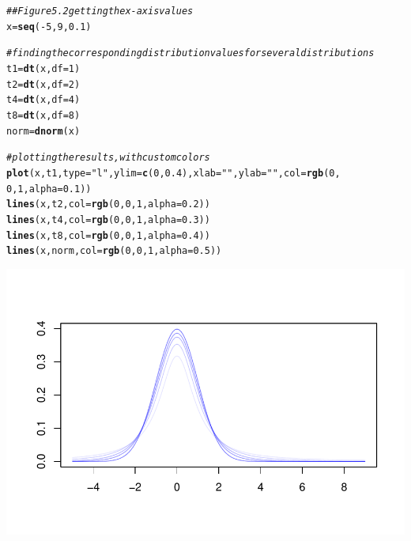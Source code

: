\documentclass{report}\usepackage[]{graphicx}\usepackage[]{color}
\makeatletter
\def\maxwidth{ %
  \ifdim\Gin@nat@width>\linewidth
    \linewidth
  \else
    \Gin@nat@width
  \fi
}
\newcommand{\hlnum}[1]{\textcolor[rgb]{0.686,0.059,0.569}{#1}}%
\newcommand{\hlstr}[1]{\textcolor[rgb]{0.192,0.494,0.8}{#1}}%
\newcommand{\hlcom}[1]{\textcolor[rgb]{0.678,0.584,0.686}{\textit{#1}}}%
\newcommand{\hlopt}[1]{\textcolor[rgb]{0,0,0}{#1}}%
\newcommand{\hlstd}[1]{\textcolor[rgb]{0.345,0.345,0.345}{#1}}%
\newcommand{\hlkwb}[1]{\textcolor[rgb]{0.69,0.353,0.396}{#1}}%
\newcommand{\hlkwc}[1]{\textcolor[rgb]{0.333,0.667,0.333}{#1}}%
\newcommand{\hlkwd}[1]{\textcolor[rgb]{0.737,0.353,0.396}{\textbf{#1}}}%
\newenvironment{kframe}{%
 \def\at@end@of@kframe{}%
 \ifinner\ifhmode%
  \def\at@end@of@kframe{\end{minipage}}%
  \begin{minipage}{\columnwidth}%
 \fi\fi%
 \def\FrameCommand##1{\hskip\@totalleftmargin \hskip-\fboxsep
 \colorbox{shadecolor}{##1}\hskip-\fboxsep
     \hskip-\linewidth \hskip-\@totalleftmargin \hskip\columnwidth}%
 \MakeFramed {\advance\hsize-\width
   \@totalleftmargin\z@ \linewidth\hsize
   \@setminipage}}%
 {\par\unskip\endMakeFramed%
 \at@end@of@kframe}
\newenvironment{knitrout}{}{} %
\makeatother
\begin{document}
\begin{knitrout}
\color{fgcolor}\begin{kframe}
\begin{alltt}
\hlcom{## Figure 5.2 getting the x-axis values}
\hlstd{x} \hlkwb{=} \hlkwd{seq}\hlstd{(}\hlopt{-}\hlnum{5}\hlstd{,} \hlnum{9}\hlstd{,} \hlnum{0.1}\hlstd{)}

\hlcom{# finding the corresponding distribution values for several distributions}
\hlstd{t1} \hlkwb{=} \hlkwd{dt}\hlstd{(x,} \hlkwc{df} \hlstd{=} \hlnum{1}\hlstd{)}
\hlstd{t2} \hlkwb{=} \hlkwd{dt}\hlstd{(x,} \hlkwc{df} \hlstd{=} \hlnum{2}\hlstd{)}
\hlstd{t4} \hlkwb{=} \hlkwd{dt}\hlstd{(x,} \hlkwc{df} \hlstd{=} \hlnum{4}\hlstd{)}
\hlstd{t8} \hlkwb{=} \hlkwd{dt}\hlstd{(x,} \hlkwc{df} \hlstd{=} \hlnum{8}\hlstd{)}
\hlstd{norm} \hlkwb{=} \hlkwd{dnorm}\hlstd{(x)}

\hlcom{# plotting the results, with custom colors}
\hlkwd{plot}\hlstd{(x, t1,} \hlkwc{type} \hlstd{=} \hlstr{"l"}\hlstd{,} \hlkwc{ylim} \hlstd{=} \hlkwd{c}\hlstd{(}\hlnum{0}\hlstd{,} \hlnum{0.4}\hlstd{),} \hlkwc{xlab} \hlstd{=} \hlstr{""}\hlstd{,} \hlkwc{ylab} \hlstd{=} \hlstr{""}\hlstd{,} \hlkwc{col} \hlstd{=} \hlkwd{rgb}\hlstd{(}\hlnum{0}\hlstd{,}
    \hlnum{0}\hlstd{,} \hlnum{1}\hlstd{,} \hlkwc{alpha} \hlstd{=} \hlnum{0.1}\hlstd{))}
\hlkwd{lines}\hlstd{(x, t2,} \hlkwc{col} \hlstd{=} \hlkwd{rgb}\hlstd{(}\hlnum{0}\hlstd{,} \hlnum{0}\hlstd{,} \hlnum{1}\hlstd{,} \hlkwc{alpha} \hlstd{=} \hlnum{0.2}\hlstd{))}
\hlkwd{lines}\hlstd{(x, t4,} \hlkwc{col} \hlstd{=} \hlkwd{rgb}\hlstd{(}\hlnum{0}\hlstd{,} \hlnum{0}\hlstd{,} \hlnum{1}\hlstd{,} \hlkwc{alpha} \hlstd{=} \hlnum{0.3}\hlstd{))}
\hlkwd{lines}\hlstd{(x, t8,} \hlkwc{col} \hlstd{=} \hlkwd{rgb}\hlstd{(}\hlnum{0}\hlstd{,} \hlnum{0}\hlstd{,} \hlnum{1}\hlstd{,} \hlkwc{alpha} \hlstd{=} \hlnum{0.4}\hlstd{))}
\hlkwd{lines}\hlstd{(x, norm,} \hlkwc{col} \hlstd{=} \hlkwd{rgb}\hlstd{(}\hlnum{0}\hlstd{,} \hlnum{0}\hlstd{,} \hlnum{1}\hlstd{,} \hlkwc{alpha} \hlstd{=} \hlnum{0.5}\hlstd{))}
\end{alltt}
\end{kframe}

{\centering \includegraphics[width=\maxwidth]{figure/unnamed-chunk-79-1} 

}



\end{knitrout}
\end{document}
